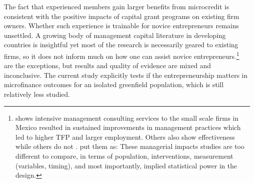 	The fact that experienced members gain larger benefits from microcredit is consistent with the positive impacts of capital grant programs on existing firm owners. Whether such experience is trainable for novice entrepreneurs remains unsettled. A growing body of management capital literature in developing countries is insightful yet most of the research is necessarily geared to existing firms, so it does not inform much on how one can assist novice entrepreneurs.\footnote{\citet{BruhnKarlanSchoar2018} shows intensive management consulting services to the small scale firms in Mexico resulted in sustained improvements in management practices which led to higher TFP and larger employment. Others also show effectiveness \citep{Calderon2011, Berge2012, Bloometal2013} while others do not \citep{Bruhn2012, KarlanKnightUdry2015}. \citet{MckenzieWoodruff2013} put them as: These managerial impacts studies are too different to compare, in terms of population, interventions, measurement (variables, timing), and most importantly, implied statistical power in the design. } \citet{KarlanValvidia2011, BruhnZia2011, Argent2014} are the exceptions, but results and quality of evidence are mixed and inconclusive. The current study explicitly tests if the entrepreneurship matters in microfinance outcomes for an isolated greenfield population, which is still relatively less studied. %

